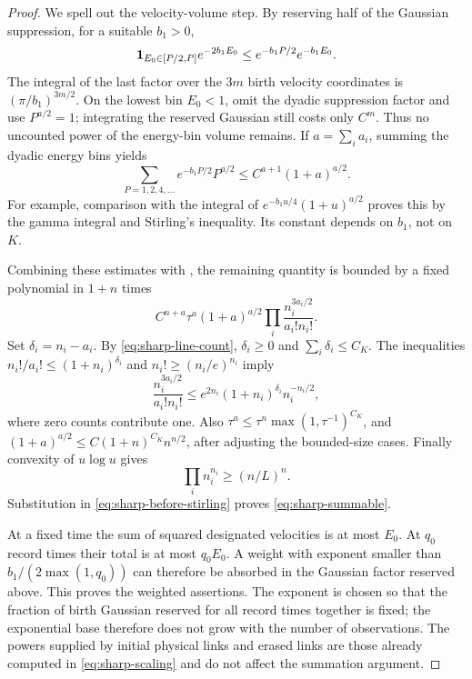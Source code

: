\begin{proof}
We spell out the velocity-volume step.  By reserving half of the
Gaussian suppression, for a suitable \(b_1>0\),
\[
 \mathbf 1_{E_0\in[P/2,P]}e^{-2b_1E_0}
       \le e^{-b_1P/2}e^{-b_1E_0}.
\]
The integral of the last factor over the \(3m\) birth velocity
coordinates is \((\pi/b_1)^{3m/2}\).  On the lowest bin \(E_0<1\),
omit the dyadic suppression factor and use \(P^{a/2}=1\);
integrating the reserved Gaussian still costs only \(C^m\).
Thus no uncounted power of the energy-bin volume remains.
If \(a=\sum_i a_i\), summing the
dyadic energy bins yields
\begin{equation}\label{eq:sharp-energy-sum}
 \sum_{P=1,2,4,\ldots} e^{-b_1P/2}P^{a/2}
                    \le C^{a+1}(1+a)^{a/2}.
\end{equation}
For example, comparison with the integral of
\(e^{-b_1u/4}(1+u)^{a/2}\) proves this by the gamma integral and
Stirling's inequality.  Its constant depends on \(b_1\), not on
\(K\).

Combining these estimates with , the
remaining quantity is bounded by a fixed polynomial in \(1+n\)
times
\begin{equation}\label{eq:sharp-before-stirling}
 C^{n+a}\tau^a(1+a)^{a/2}
            \prod_i\frac{n_i^{3a_i/2}}{a_i!n_i!}.
\end{equation}
Set \(\delta_i=n_i-a_i\).  By
\eqref{eq:sharp-line-count}, \(\delta_i\ge0\) and
\(\sum_i\delta_i\le C_K\).  The inequalities
\(n_i!/a_i!\le(1+n_i)^{\delta_i}\) and
\(n_i!\ge(n_i/e)^{n_i}\) imply
\[
 \frac{n_i^{3a_i/2}}{a_i!n_i!}
 \le e^{2n_i}(1+n_i)^{\delta_i}n_i^{-n_i/2},
\]
where zero counts contribute one.  Also
\(\tau^a\le\tau^n\max(1,\tau^{-1})^{C_K}\), and
\((1+a)^{a/2}\le C(1+n)^{C_K}n^{n/2}\), after adjusting the
bounded-size cases.  Finally convexity of \(u\log u\) gives
\begin{equation}\label{eq:sharp-layer-entropy}
               \prod_i n_i^{n_i}\ge(n/L)^n.
\end{equation}
Substitution in \eqref{eq:sharp-before-stirling} proves
\eqref{eq:sharp-summable}.

At a fixed time the sum of squared designated velocities is at
most \(E_0\).  At \(q_0\) record times their total is at most
\(q_0E_0\).  A weight with exponent smaller than
\(b_1/(2\max(1,q_0))\) can therefore be absorbed in the Gaussian
factor reserved above.  This proves the weighted assertions.  The
exponent is chosen so that the fraction of birth Gaussian reserved
for all record times together is fixed; the exponential base
therefore does not grow with the number of observations.  The powers
supplied by initial physical links
and erased links are those already computed in
\eqref{eq:sharp-scaling} and do not affect the summation argument.
\end{proof}

